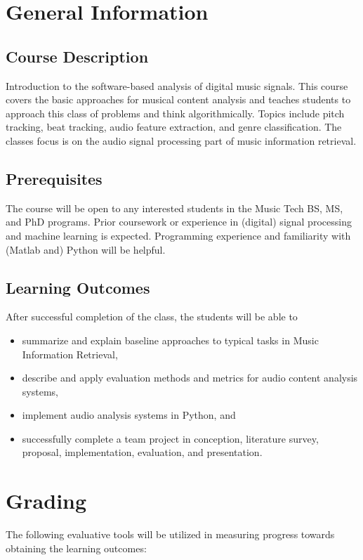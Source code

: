 \documentclass[letterpaper,oneside,10pt]{scrartcl}
\begin{document}
         
\section{General Information}        
    \subsection{Course Description}
        Introduction to the software-based analysis of digital music signals. This course covers the basic approaches for musical content analysis and teaches students to approach this class of problems and think algorithmically. Topics include pitch tracking, beat tracking, audio feature extraction, and genre classification. The classes focus is on the audio signal processing part of music information retrieval.
        
    \subsection{Prerequisites}
        The course will be open to any interested students in the Music Tech BS, MS, and PhD programs. Prior coursework or experience in (digital) signal processing and machine learning is expected. Programming experience and familiarity with (Matlab and) Python will be helpful. 

    \subsection{Learning Outcomes}        
        After successful completion of the class, the students will be able to 
        \begin{itemize}
            \item   summarize and explain baseline approaches to typical tasks in Music Information Retrieval,
            \item   describe and apply evaluation methods and metrics for audio content analysis systems,
            \item   implement audio analysis systems in Python, and
            \item   successfully complete a team project in conception, literature survey, proposal, implementation, evaluation, and presentation.
        \end{itemize}

\section{Grading}
    The following evaluative tools will be utilized in measuring progress towards obtaining the learning outcomes:
    \smallskip
    
\end{document}
